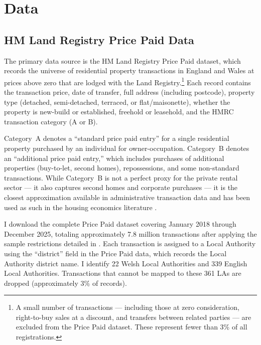 \documentclass[12pt]{article}
\begin{document}
\section{Data}
\label{sec:data}

\subsection{HM Land Registry Price Paid Data}

The primary data source is the HM Land Registry Price Paid dataset, which records the universe of residential property transactions in England and Wales at prices above zero that are lodged with the Land Registry.\footnote{A small number of transactions --- including those at zero consideration, right-to-buy sales at a discount, and transfers between related parties --- are excluded from the Price Paid dataset. These represent fewer than 3\% of all registrations.} Each record contains the transaction price, date of transfer, full address (including postcode), property type (detached, semi-detached, terraced, or flat/maisonette), whether the property is new-build or established, freehold or leasehold, and the HMRC transaction category (A or B).

Category~A denotes a ``standard price paid entry'' for a single residential property purchased by an individual for owner-occupation. Category~B denotes an ``additional price paid entry,'' which includes purchases of additional properties (buy-to-let, second homes), repossessions, and some non-standard transactions. While Category~B is not a perfect proxy for the private rental sector --- it also captures second homes and corporate purchases --- it is the closest approximation available in administrative transaction data and has been used as such in the housing economics literature \citep{hilber2016impact}.

I download the complete Price Paid dataset covering January 2018 through December 2025, totaling approximately 7.8 million transactions after applying the sample restrictions detailed in . Each transaction is assigned to a Local Authority using the ``district'' field in the Price Paid data, which records the Local Authority district name. I identify 22 Welsh Local Authorities and 339 English Local Authorities. Transactions that cannot be mapped to these 361 LAs are dropped (approximately 3\% of records).
\end{document}
